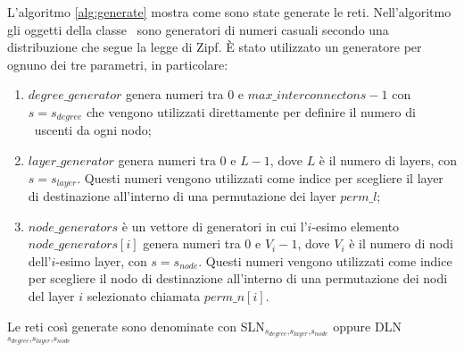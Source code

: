 L'algoritmo \vref{alg:generate} mostra come sono state generate le reti.
Nell'algoritmo gli oggetti della classe \tzgen\ sono generatori di numeri 
casuali secondo una distribuzione che segue la legge di Zipf. È stato utilizzato 
un generatore per ognuno dei tre parametri, in particolare:
\begin{enumerate}
    \item $degree\_generator$ genera numeri tra 0 e $max\_interconnectons - 1$
        con $s = s_{degree}$ che vengono utilizzati direttamente per definire il 
        numero di \interc\ uscenti da ogni nodo;
    \item $layer\_generator$ genera numeri tra 0 e $L - 1$, dove $L$ è il 
        numero di layers, con $s = s_{layer}$. Questi numeri vengono utilizzati 
        come indice per scegliere il layer di destinazione all'interno di una 
        permutazione dei layer $perm\_l$;
    \item $node\_generators$ è un vettore di generatori in cui 
        l'$i$-esimo elemento $node\_generators[i]$ genera numeri 
        tra 0 e $V_i - 1$, dove $V_i$ è il numero di nodi dell'$i$-esimo layer, 
        con $s = s_{node}$. Questi numeri vengono utilizzati 
        come indice per scegliere il nodo di destinazione all'interno 
        di una permutazione dei nodi del layer $i$ selezionato 
        chiamata $perm\_n[i]$.
\end{enumerate}

Le reti così generate sono denominate con 
SLN{\Large$_{ s_{degree}\text{,}s_{layer}\text{,}s_{node}}$}
oppure
DLN{\Large$_{ s_{degree}\text{,}s_{layer}\text{,}s_{node}}$}



  
